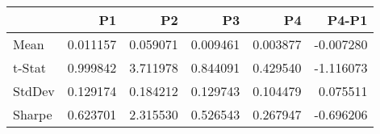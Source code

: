 \begin{tabular}{lrrrrr}
\toprule
 & P1 & P2 & P3 & P4 & P4-P1 \\
\midrule
Mean & 0.011157 & 0.059071 & 0.009461 & 0.003877 & -0.007280 \\
t-Stat & 0.999842 & 3.711978 & 0.844091 & 0.429540 & -1.116073 \\
StdDev & 0.129174 & 0.184212 & 0.129743 & 0.104479 & 0.075511 \\
Sharpe & 0.623701 & 2.315530 & 0.526543 & 0.267947 & -0.696206 \\
\bottomrule
\end{tabular}
